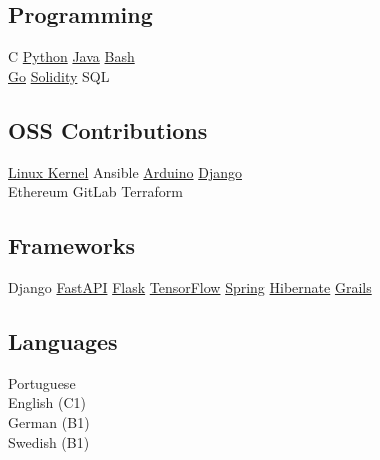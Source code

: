 \documentclass[]{willianpaixao-resume}
\begin{document}
\begin{minipage}[t]{0.34\textwidth}
\subsection{Programming}
C\textbullet
\href{http://www.python.org}{Python}\textbullet{}
\href{https://www.oracle.com/java/}{Java}\textbullet{}
\href{https://www.gnu.org/software/bash/}{Bash}\\
\href{https://go.dev/}{Go}\textbullet{}
\href{https://soliditylang.org/}{Solidity}\textbullet{}
SQL
\sectionsep

\subsection{OSS Contributions}
\href{https://kernel.org/}{Linux Kernel}\textbullet{}
Ansible\textbullet{}
\href{https://www.arduino.cc/}{Arduino}\textbullet{}
\href{https://www.djangoproject.com/}{Django}\\
Ethereum\textbullet{}
GitLab\textbullet{}
Terraform
\sectionsep

\subsection{Frameworks}
Django\textbullet{}
\href{https://fastapi.tiangolo.com/}{FastAPI}\textbullet{}
\href{https://flask.palletsprojects.com/}{Flask}\textbullet{}
\href{https://www.tensorflow.org/}{TensorFlow}
\href{https://spring.io/}{Spring}\textbullet{}
\href{https://hibernate.org/}{Hibernate}\textbullet{}
\href{https://grails.org/}{Grails}
\sectionsep

\subsection{Languages}
Portuguese\\
English (C1)\\
German (B1)\\
Swedish (B1)
\sectionsep


\end{minipage}
\hfill
\end{document}

